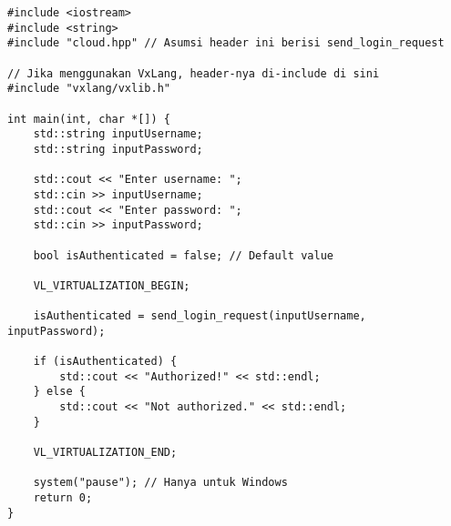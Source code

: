 \begin{verbatim}
#include <iostream>
#include <string>
#include "cloud.hpp" // Asumsi header ini berisi send_login_request

// Jika menggunakan VxLang, header-nya di-include di sini
#include "vxlang/vxlib.h"

int main(int, char *[]) {
    std::string inputUsername;
    std::string inputPassword;

    std::cout << "Enter username: ";
    std::cin >> inputUsername;
    std::cout << "Enter password: ";
    std::cin >> inputPassword;

    bool isAuthenticated = false; // Default value

    VL_VIRTUALIZATION_BEGIN;

    isAuthenticated = send_login_request(inputUsername, inputPassword);

    if (isAuthenticated) {
        std::cout << "Authorized!" << std::endl;
    } else {
        std::cout << "Not authorized." << std::endl;
    }

    VL_VIRTUALIZATION_END;

    system("pause"); // Hanya untuk Windows
    return 0;
}
    \end{verbatim}
\label{lst:console_cloud_full}



